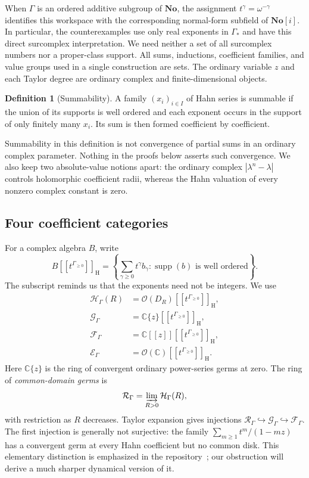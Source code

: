 \documentclass[11pt,a4paper]{article}
\numberwithin{equation}{section}
\theoremstyle{definition}
\newtheorem{definition}[theorem]{Definition}
\theoremstyle{remark}
\newcommand{\C}{\mathbb C}
\newcommand{\No}{\mathbf{No}}
\newcommand{\HH}{\mathcal H}
\newcommand{\GG}{\mathcal G}
\newcommand{\RR}{\mathcal R}
\newcommand{\FF}{\mathcal F}
\newcommand{\EE}{\mathcal E}
\newcommand{\supp}{\operatorname{supp}}
\newcommand{\Gstar}{\Gamma_*}
\begin{document}
When $\Gamma$ is an ordered additive subgroup of $\No$, the assignment
$t^\gamma=\omega^{-\gamma}$ identifies this workspace with the corresponding
normal-form subfield of $\No[i]$. In particular, the counterexamples use only
real exponents in $\Gstar$ and have this direct surcomplex interpretation.
We need neither a set of all surcomplex numbers nor a proper-class support.
All sums, inductions, coefficient families, and value groups used in a single
construction are sets. The ordinary variable $z$ and each Taylor degree are
ordinary complex and finite-dimensional objects.

\begin{definition}[Summability]
A family $(x_i)_{i\in I}$ of Hahn series is summable if the union of its
supports is well ordered and each exponent occurs in the support of only
finitely many $x_i$. Its sum is then formed coefficient by coefficient.
\end{definition}

Summability in this definition is not convergence of partial sums in an
ordinary complex parameter. Nothing in the proofs below asserts such
convergence. We also keep two absolute-value notions apart: the ordinary
complex $|\lambda^n-\lambda|$ controls holomorphic coefficient radii, whereas
the Hahn valuation of every nonzero complex constant is zero.

\subsection{Four coefficient categories}

For a complex algebra $B$, write
\[
 B[[t^{\Gamma_{\ge0}}]]_{\mathrm H}
 =\left\{\sum_{\gamma\ge0}t^\gamma b_\gamma:
               \supp(b)\text{ is well ordered}\right\}.
\]
The subscript reminds us that the exponents need not be integers. We use
\begin{align*}
 \HH_\Gamma(R)&=\mathcal O(D_R)[[t^{\Gamma_{\ge0}}]]_{\mathrm H},\\
 \GG_\Gamma&=\C\{z\}[[t^{\Gamma_{\ge0}}]]_{\mathrm H},\\
 \FF_\Gamma&=\C[[z]][[t^{\Gamma_{\ge0}}]]_{\mathrm H},\\
 \EE_\Gamma&=\mathcal O(\C)[[t^{\Gamma_{\ge0}}]]_{\mathrm H}.
\end{align*}
Here $\C\{z\}$ is the ring of convergent ordinary power-series germs at
zero. The ring of \emph{common-domain germs} is
\[
 \RR_\Gamma=\varinjlim_{R>0}\HH_\Gamma(R),
\]
with restriction as $R$ decreases. Taylor expansion gives injections
$\RR_\Gamma\hookrightarrow\GG_\Gamma\hookrightarrow\FF_\Gamma$.
The first injection is generally not surjective: the family
$\sum_{m\ge1}t^m/(1-mz)$ has a convergent germ at every Hahn coefficient
but no common disk. This elementary distinction is emphasized in the
repository~\cite{Repo}; our obstruction will derive a much sharper dynamical
version of it.
\end{document}
